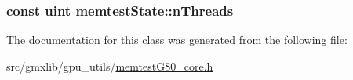 \hypertarget{classmemtestState_a15859b1ffa8a2b2b8008cf9570987c37}{
\subsubsection[{n\-Threads}]{\setlength{\rightskip}{0pt plus 5cm}const {\bf uint} {\bf memtest\-State\-::n\-Threads}}}\label{classmemtestState_a15859b1ffa8a2b2b8008cf9570987c37}


\-The documentation for this class was generated from the following file\-:\begin{DoxyCompactItemize}
\item 
src/gmxlib/gpu\-\_\-utils/\hyperlink{memtestG80__core_8h}{memtest\-G80\-\_\-core.\-h}\end{DoxyCompactItemize}
